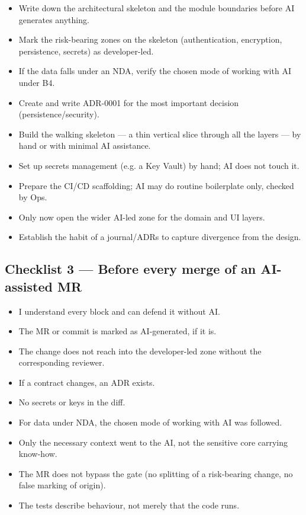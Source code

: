 \begin{itemize}[label={}]
\item \cb Write down the architectural skeleton and the module boundaries before AI generates anything.
\item \cb Mark the risk-bearing zones on the skeleton (authentication, encryption, persistence, secrets) as developer-led.
\item \cb If the data falls under an NDA, verify the chosen mode of working with AI under B4.
\item \cb Create  and write ADR-0001 for the most important decision (persistence/security).
\item \cb Build the walking skeleton --- a thin vertical slice through all the layers --- by hand or with minimal AI assistance.
\item \cb Set up secrets management (e.g. a Key Vault) by hand; AI does not touch it.
\item \cb Prepare the CI/CD scaffolding; AI may do routine boilerplate only, checked by Ops.
\item \cb Only now open the wider AI-led zone for the domain and UI layers.
\item \cb Establish the habit of a journal/ADRs to capture divergence from the design.
\end{itemize}

\subsection{Checklist 3 --- Before every merge of an AI-assisted MR}

\begin{itemize}[label={}]
\item \cb I understand every block and can defend it without AI.
\item \cb The MR or commit is marked as AI-generated, if it is.
\item \cb The change does not reach into the developer-led zone without the corresponding reviewer.
\item \cb If a contract changes, an ADR exists.
\item \cb No secrets or keys in the diff.
\item \cb For data under NDA, the chosen mode of working with AI was followed.
\item \cb Only the necessary context went to the AI, not the sensitive core carrying know-how.
\item \cb The MR does not bypass the gate (no splitting of a risk-bearing change, no false marking of origin).
\item \cb The tests describe behaviour, not merely that the code runs.
\end{itemize}

